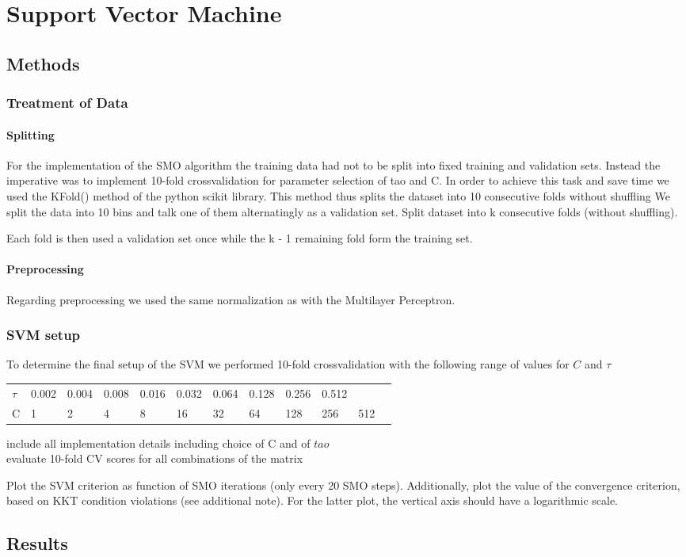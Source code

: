 \section{Support Vector Machine}

\subsection{Methods}

\subsubsection{Treatment of Data}
\paragraph{Splitting}
For the implementation of the SMO algorithm the training data had not to be split into fixed training and validation sets. Instead the imperative was to implement 10-fold crossvalidation for parameter selection of tao and C. In order to achieve this task and save time we used the KFold() method of the python scikit library. This method thus splits the dataset into 10 consecutive folds without shuffling We split the data into 10 bins and talk one of them alternatingly as a validation set.
Split dataset into k consecutive folds (without shuffling).

Each fold is then used a validation set once while the k - 1 remaining fold form the training set.

\paragraph{Preprocessing}
Regarding preprocessing we used the same normalization as with the Multilayer Perceptron.

\subsubsection{SVM setup}
To determine the final setup of the SVM we performed 10-fold crossvalidation with the following range of values for $C$ and $\tau$
\newline
\begin{tabular}{llllllllllll} 
\toprule
$\tau$ & 0.002 & 0.004 & 0.008 & 0.016 & 0.032 & 0.064 & 0.128 & 0.256 & 0.512 \\
C & 1 & 2 & 4 & 8 & 16 & 32 & 64 & 128 & 256 & 512 \\
\bottomrule
\end{tabular}

include all implementation details including choice of C and of $tao$\\
evaluate 10-fold CV scores for all combinations of the matrix

Plot the SVM criterion as function of SMO iterations (only
every 20 SMO steps). Additionally, plot the value of the convergence criterion,
based on KKT condition violations (see additional note). For the latter plot,
the vertical axis should have a logarithmic scale.
\subsection{Results}